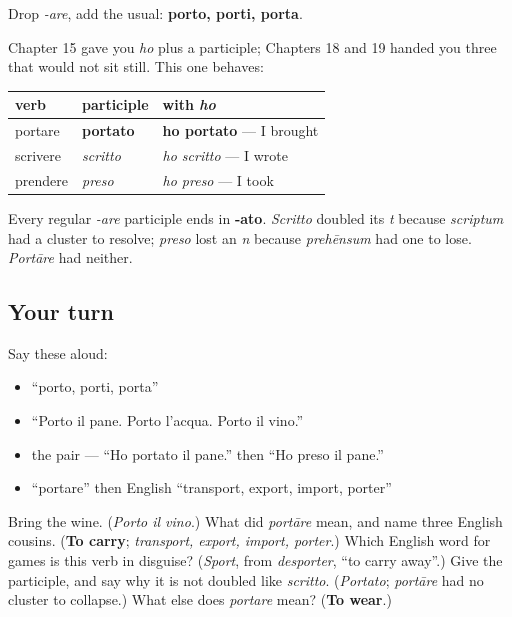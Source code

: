 \begin{grammarlens}[title={Grammar Lens: the endings, and a participle that behaves}]
Drop \emph{-are}, add the usual: \textbf{porto, porti, porta}.

Chapter 15 gave you \emph{ho} plus a participle; Chapters 18 and 19 handed you three that would not sit still. This one behaves:

\noindent
\begin{tabularx}{\linewidth}{@{}>{\raggedright\arraybackslash}X>{\raggedright\arraybackslash}X>{\raggedright\arraybackslash}X@{}}
\toprule
\textbf{verb} & \textbf{participle} & \textbf{with \emph{ho}} \\
\midrule
portare & \textbf{portato} & \textbf{ho portato} — I brought \\
scrivere & \emph{scritto} & \emph{ho scritto} — I wrote \\
prendere & \emph{preso} & \emph{ho preso} — I took \\
\bottomrule
\end{tabularx}

Every regular \emph{-are} participle ends in \textbf{-ato}. \emph{Scritto} doubled its \emph{t} because \emph{scriptum} had a cluster to resolve; \emph{preso} lost an \emph{n} because \emph{prehēnsum} had one to lose. \emph{Portāre} had neither.
\end{grammarlens}

\subsection*{Your turn}
Say these aloud:

\begin{itemize}
\raggedright
  \item \textquotedblleft{}porto, porti, porta\textquotedblright{}
  \item \textquotedblleft{}Porto il pane. Porto l'acqua. Porto il vino.\textquotedblright{}
  \item the pair — \textquotedblleft{}Ho portato il pane.\textquotedblright{} then \textquotedblleft{}Ho preso il pane.\textquotedblright{}
  \item \textquotedblleft{}portare\textquotedblright{} then English \textquotedblleft{}transport, export, import, porter\textquotedblright{}
\end{itemize}

\begin{tcolorbox}[breakable,colback=teal!4,colframe=teal!35!black,title={Before you move on}]
Bring the wine. (\emph{Porto il vino}.) What did \emph{portāre} mean, and name three English cousins. (\textbf{To carry}; \emph{transport, export, import, porter}.) Which English word for games is this verb in disguise? (\emph{Sport}, from \emph{desporter}, \textquotedblleft{}to carry away\textquotedblright{}.) Give the participle, and say why it is not doubled like \emph{scritto}. (\emph{Portato}; \emph{portāre} had no cluster to collapse.) What else does \emph{portare} mean? (\textbf{To wear}.)
\end{tcolorbox}
